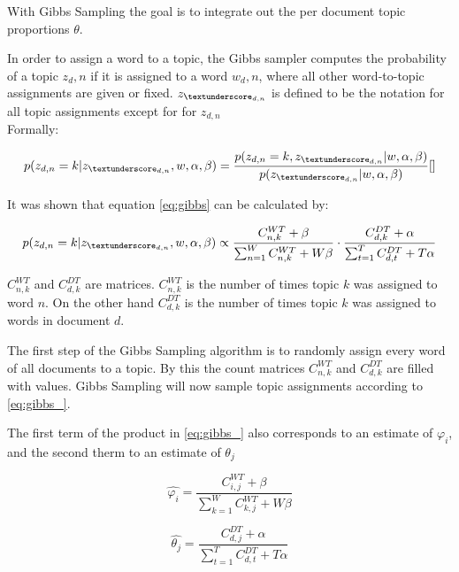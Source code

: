 \documentclass[a4paper,ngerman]{atseminar}
\begin{document}
With Gibbs Sampling the goal is to integrate out the per document topic proportions $\theta$.

In order to assign a word to a topic, the Gibbs sampler computes the probability of a topic $z_d,n$ if it is assigned to a word $w_d,n$, where 
all other word-to-topic assignments are given or fixed. $z_{\textunderscore_ {d,n}}$ is defined to be the notation for all topic assignments except 
for for $z_{d,n}$ \\
Formally:

\begin{equation} \label{eq:gibbs}
p(z_{d,n} = k | z_{\textunderscore_ {d,n}},w,\alpha, \beta) = \frac{p(z_{d,n}=k, z_{\textunderscore_ {d,n}} | w, \alpha, \beta)}{p(z_{\textunderscore_ {d,n}} | w,\alpha, \beta)}
\ref{}
\end{equation}

It was shown \cite{griffiths2004finding} that equation \ref{eq:gibbs} can be calculated by:

\begin{equation} \label{eq:gibbs_}
p(z_{d,n} = k | z_{\textunderscore_ {d,n}},w,\alpha, \beta) \propto \frac{C_{n,k}^{WT}+\beta}
{\sum_{n=1}^{W}C_{n,k}^{WT}+W\beta} \cdot \frac{C_{d,k}^{DT}+\alpha}{\sum_{t=1}^{T}C_{d,t}^{DT}+T\alpha}
\end{equation}

$C_{n,k}^{WT}$ and $C_{d,k}^{DT}$ are matrices. $C_{n,k}^{WT}$ is the number of times topic $k$ was assigned to 
word $n$. On the other hand $C_{d,k}^{DT}$ is the number of times topic $k$ was assigned to words in document $d$.

The first step of the Gibbs Sampling algorithm is to randomly assign every word of all documents to a topic. By this 
the count matrices $C_{n,k}^{WT}$ and $C_{d,k}^{DT}$ are filled with values.
Gibbs Sampling will now sample topic assignments according to \ref{eq:gibbs_}.

The first term of the product in \ref{eq:gibbs_} also corresponds to an estimate of $\varphi_i$, 
and the second therm to an estimate of $\theta_j$

\begin{equation}
\hat{\varphi_i} = \frac{C_{i,j}^{WT}+\beta} {\sum_{k=1}^{W}C_{k,j}^{WT}+W\beta}
\end{equation}

\begin{equation}
\hat{\theta_j} = \frac{C_{d,j}^{DT}+\alpha}{\sum_{t=1}^{T}C_{d,t}^{DT}+T\alpha}
\end{equation}
\end{document}
